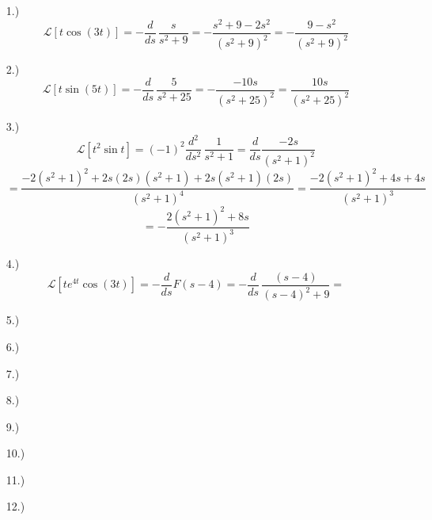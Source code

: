 \documentclass[12pt]{article}
\newcommand{\bracks}[1]{\left[#1\right]}
\newcommand{\lp}{\mathcal{L}}
\begin{document}
\pagestyle{fancy}
\fancyhead{}

\normalsize
\begin{itemize}
    \item [1.)] \[\lp\bracks{t\cos(3t)}=-\frac{d}{ds}\,\frac{s}{s^2+9}=-\frac{s^2+9-2s^2}{(s^2+9)^2}=-\frac{9-s^2}{(s^2+9)^2}\]

    \item [2.)] \[\lp\bracks{t\sin(5t)}=-\frac{d}{ds}\,\frac{5}{s^2+25}=-\frac{-10s}{(s^2+25)^2}=\frac{10s}{(s^2+25)^2}\]
    
    \item [3.)] \[\lp\bracks{t^2\sin t}=(-1)^2\frac{d^2}{ds^2}\,\frac{1}{s^2+1}=\frac{d}{ds}\frac{-2s}{(s^2+1)^2}\]
    \[=\frac{-2(s^2+1)^2+2s(2s)(s^2+1)+2s(s^2+1)(2s)}{(s^2+1)^4}=\frac{-2(s^2+1)^2+4s+4s}{(s^2+1)^3}\]
    \[=-\frac{2(s^2+1)^2+8s}{(s^2+1)^3}\]
    
    \item [4.)] \[\lp\bracks{te^{4t}\cos(3t)}=-\frac{d}{ds}F(s-4)=-\frac{d}{ds}\,\frac{(s-4)}{(s-4)^2+9}=\]
    
    \item [5.)] 
    
    \item [6.)] 
    
    \item [7.)] 
    
    \item [8.)] 
    
    \item [9.)] 
    
    \item [10.)] 
    
    \item [11.)] 
    
    \item [12.)] 
    
\end{itemize}
\end{document}
